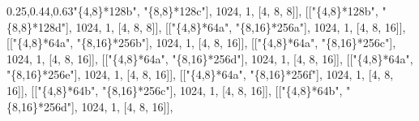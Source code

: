 \documentclass[
  10pt,
  letterpaper,
]{article}
\newenvironment{Shaded}{}{}
\newcommand{\FloatTok}[1]{\textcolor[rgb]{0.25,0.63,0.44}{#1}}
\newcommand{\NormalTok}[1]{#1}
\newcommand{\OperatorTok}[1]{\textcolor[rgb]{0.40,0.40,0.40}{#1}}
\newcommand{\StringTok}[1]{\textcolor[rgb]{0.25,0.44,0.63}{#1}}
\begin{document}
\begin{Shaded}
\begin{Highlighting}[]
\NormalTok{[[}\StringTok{"\{4,8\}*128b"}\OperatorTok{,} \StringTok{"\{8,8\}*128c"}\NormalTok{]}\OperatorTok{,} \FloatTok{1024}\OperatorTok{,} \FloatTok{1}\OperatorTok{,}\NormalTok{ [}\FloatTok{4}\OperatorTok{,} \FloatTok{8}\OperatorTok{,} \FloatTok{8}\NormalTok{]]}\OperatorTok{,}
\NormalTok{[[}\StringTok{"\{4,8\}*128b"}\OperatorTok{,} \StringTok{"\{8,8\}*128d"}\NormalTok{]}\OperatorTok{,} \FloatTok{1024}\OperatorTok{,} \FloatTok{1}\OperatorTok{,}\NormalTok{ [}\FloatTok{4}\OperatorTok{,} \FloatTok{8}\OperatorTok{,} \FloatTok{8}\NormalTok{]]}\OperatorTok{,}
\NormalTok{[[}\StringTok{"\{4,8\}*64a"}\OperatorTok{,} \StringTok{"\{8,16\}*256a"}\NormalTok{]}\OperatorTok{,} \FloatTok{1024}\OperatorTok{,} \FloatTok{1}\OperatorTok{,}\NormalTok{ [}\FloatTok{4}\OperatorTok{,} \FloatTok{8}\OperatorTok{,} \FloatTok{16}\NormalTok{]]}\OperatorTok{,}
\NormalTok{[[}\StringTok{"\{4,8\}*64a"}\OperatorTok{,} \StringTok{"\{8,16\}*256b"}\NormalTok{]}\OperatorTok{,} \FloatTok{1024}\OperatorTok{,} \FloatTok{1}\OperatorTok{,}\NormalTok{ [}\FloatTok{4}\OperatorTok{,} \FloatTok{8}\OperatorTok{,} \FloatTok{16}\NormalTok{]]}\OperatorTok{,}
\NormalTok{[[}\StringTok{"\{4,8\}*64a"}\OperatorTok{,} \StringTok{"\{8,16\}*256c"}\NormalTok{]}\OperatorTok{,} \FloatTok{1024}\OperatorTok{,} \FloatTok{1}\OperatorTok{,}\NormalTok{ [}\FloatTok{4}\OperatorTok{,} \FloatTok{8}\OperatorTok{,} \FloatTok{16}\NormalTok{]]}\OperatorTok{,}
\NormalTok{[[}\StringTok{"\{4,8\}*64a"}\OperatorTok{,} \StringTok{"\{8,16\}*256d"}\NormalTok{]}\OperatorTok{,} \FloatTok{1024}\OperatorTok{,} \FloatTok{1}\OperatorTok{,}\NormalTok{ [}\FloatTok{4}\OperatorTok{,} \FloatTok{8}\OperatorTok{,} \FloatTok{16}\NormalTok{]]}\OperatorTok{,}
\NormalTok{[[}\StringTok{"\{4,8\}*64a"}\OperatorTok{,} \StringTok{"\{8,16\}*256e"}\NormalTok{]}\OperatorTok{,} \FloatTok{1024}\OperatorTok{,} \FloatTok{1}\OperatorTok{,}\NormalTok{ [}\FloatTok{4}\OperatorTok{,} \FloatTok{8}\OperatorTok{,} \FloatTok{16}\NormalTok{]]}\OperatorTok{,}
\NormalTok{[[}\StringTok{"\{4,8\}*64a"}\OperatorTok{,} \StringTok{"\{8,16\}*256f"}\NormalTok{]}\OperatorTok{,} \FloatTok{1024}\OperatorTok{,} \FloatTok{1}\OperatorTok{,}\NormalTok{ [}\FloatTok{4}\OperatorTok{,} \FloatTok{8}\OperatorTok{,} \FloatTok{16}\NormalTok{]]}\OperatorTok{,}
\NormalTok{[[}\StringTok{"\{4,8\}*64b"}\OperatorTok{,} \StringTok{"\{8,16\}*256c"}\NormalTok{]}\OperatorTok{,} \FloatTok{1024}\OperatorTok{,} \FloatTok{1}\OperatorTok{,}\NormalTok{ [}\FloatTok{4}\OperatorTok{,} \FloatTok{8}\OperatorTok{,} \FloatTok{16}\NormalTok{]]}\OperatorTok{,}
\NormalTok{[[}\StringTok{"\{4,8\}*64b"}\OperatorTok{,} \StringTok{"\{8,16\}*256d"}\NormalTok{]}\OperatorTok{,} \FloatTok{1024}\OperatorTok{,} \FloatTok{1}\OperatorTok{,}\NormalTok{ [}\FloatTok{4}\OperatorTok{,} \FloatTok{8}\OperatorTok{,} \FloatTok{16}\NormalTok{]]}\OperatorTok{,}

\end{Highlighting}
\end{Shaded}
\end{document}
